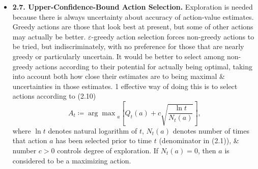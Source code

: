 \documentclass{article}
\newtheorem{problem}{Problem}
\begin{document}
\begin{itemize}
\begin{itemize}
\begin{problem}[Unbiased Constant-Step-Size Trick.]
            -- Trong hầu hết chương này, chúng tôi đã sử dụng trung bình mẫu để ước tính giá trị hành động vì trung bình mẫu không tạo ra độ lệch ban đầu như kích thước bước không đổi (xem phân tích dẫn đến (2.6)). Tuy nhiên, trung bình mẫu không phải là 1 giải pháp hoàn toàn thỏa đáng vì chúng có thể hoạt động kém trong các bài toán không dừng. Liệu có thể tránh được độ lệch của kích thước bước không đổi trong khi vẫn giữ được ưu điểm của chúng trong các bài toán không dừng không? Cách 1: sử dụng kích thước bước $\beta_n\coloneqq\frac{\alpha}{\overline{o}_n}$, để xử lý phần thưởng thứ $n$ cho 1 hành động cụ thể, trong đó $\alpha > 0$ là kích thước bước không đổi thông thường, \& $\overline{o}_n$ là dấu vết của 1 bắt đầu từ 0:
            \begin{equation*}
                \overline{o}_n\coloneqq\overline{o}_{n-1} + \alpha(1 - \overline{o}_{n-1}),\ \forall n\in\mathbb{N}^\star,\mbox{ với }\overline{o}_n\coloneqq0.
            \end{equation*}
            Thực hiện phân tích tương tự như trong (2.6) để chứng minh: $Q_n$ là trung bình trọng số mũ gần đây {\rm không có độ lệch ban đầu}.
        \end{problem}
        \item {\bf2.7. Upper-Confidence-Bound Action Selection.} Exploration is needed because there is always uncertainty about accuracy of action-value estimates. Greedy actions are those that look best at present, but some of other actions may actually be better. $\varepsilon$-greedy action selection forces non-greedy actions to be tried, but indiscriminately, with no preference for those that are nearly greedy or particularly uncertain. It would be better to select among non-greedy actions according to their potential for actually being optimal, taking into account both how close their estimates are to being maximal \& uncertainties in those estimates. 1 effective way of doing this is to select actions according to (2.10)
        \begin{equation*}
            A_t\coloneqq{\arg\max}_a\left[Q_t(a) + c\sqrt{\frac{\ln t}{N_t(a)}}\right],
        \end{equation*}
        where $\ln t$ denotes natural logarithm of $t$, $N_t(a)$ denotes number of times that action $a$ has been selected prior to time $t$ (denominator in (2.1)), \& number $c > 0$ controls degree of exploration. If $N_t(a) = 0$, then $a$ is considered to be a maximizing action.


\end{itemize}
\end{itemize}
\end{document}
